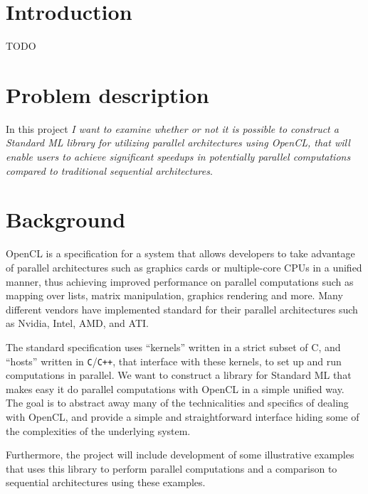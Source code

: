 \documentclass[a4paper, 10pt]{article}
\begin{document}
\maketitle

\newpage

\tableofcontents

\newpage

\section{Introduction}

TODO

\section{Problem description}

In this project \emph{I want to examine whether or not it is possible to
construct a Standard ML library for utilizing parallel architectures
using OpenCL, that will enable users to achieve significant speedups
in potentially parallel computations compared to traditional
sequential architectures}.

\section{Background}

OpenCL is a specification for a system that allows developers to take
advantage of parallel architectures such as graphics cards or
multiple-core CPUs in a unified manner, thus achieving improved
performance on parallel computations such as mapping over lists,
matrix manipulation, graphics rendering and more. Many different
vendors have implemented standard for their parallel architectures
such as Nvidia, Intel, AMD, and ATI.

The standard specification uses ``kernels'' written in a strict subset
of C, and ``hosts'' written in \verb+C+/\verb-C++-, that interface
with these kernels, to set up and run computations in parallel. We
want to construct a library for Standard ML that makes easy it do
parallel computations with OpenCL in a simple unified way. The goal is
to abstract away many of the technicalities and specifics of dealing
with OpenCL, and provide a simple and straightforward interface hiding
some of the complexities of the underlying system.

Furthermore, the project will include development of some illustrative
examples that uses this library to perform parallel computations and a
comparison to sequential architectures using these examples.
\end{document}
